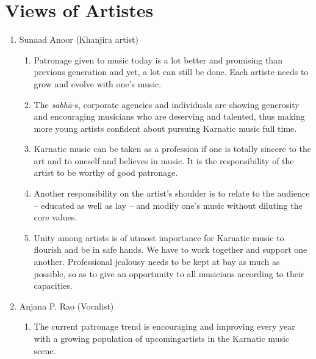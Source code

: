 \vspace{-.5cm}

\section*{Views of Artistes}

\begin{enumerate}
\itemsep=0pt

 \item Sunaad Anoor (Khanjira artist)
 
\begin{enumerate}
\itemsep=0pt

 \item Patronage given to music today is a lot better and promising than previous generation and yet, a lot can still be done. Each artiste needs to grow and evolve with one’s music.

 \item The \textit{sabhā}-s, corporate agencies and individuals are showing generosity and encouraging musicians who are deserving and talented, thus making more young artists confident about pursuing Karnatic music full time.

 \item Karnatic music can be taken as a profession if one is totally sincere to the art and to oneself and believes in music. It is the responsibility of the artist to be worthy of good patronage.

 \item Another responsibility on the artist’s shoulder is to relate to the audience – educated as well as lay – and modify one’s music without diluting the core values.

 \item Unity among artists is of utmost importance for Karnatic music to flourish and be in safe hands. We have to work together and support one another. Professional jealousy needs to be kept at bay as much as possible, so as to give an opportunity to all musicians according to their capacities.
\end{enumerate}


 \item Anjana P. Rao (Vocalist)
 
\begin{enumerate}
\itemsep=0pt

 \item The current patronage trend is encouraging and improving every year with a growing population of upcoming\break artists in the Karnatic music scene.


\end{enumerate}
\end{enumerate}
